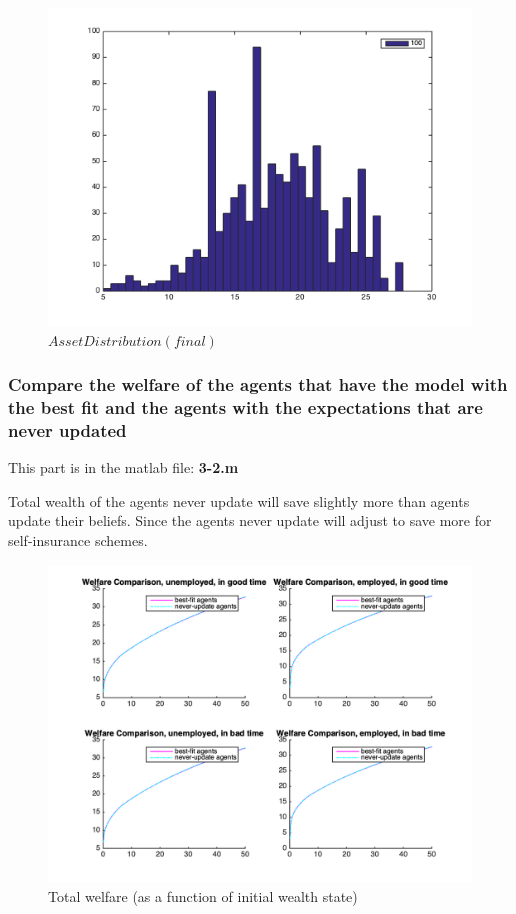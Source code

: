 \begin{figure}[htbp]
\centering
\includegraphics[width=\textwidth]{img/dist.png}
\caption{$Asset Distribution (final)$}
\end{figure}

\subsubsection{Compare the welfare of the agents that have the model with the best fit and the agents with the expectations that are never updated}

This part is in the matlab file: \textbf{3-2.m}

Total wealth of the agents never update will save slightly more than agents update their beliefs. Since the agents never update will adjust to save more for self-insurance schemes.

\begin{figure}[htbp]
\centering
\includegraphics[width=\textwidth]{img/Q3_2_b.png}
\caption{Total welfare (as a function of initial wealth state)}
\end{figure}

